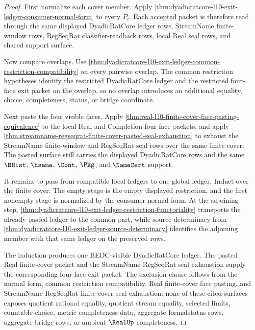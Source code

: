 \begin{proof}
First normalize each cover member. Apply \autoref{thm:dyadicratcore-l10-exit-ledger-consumer-normal-form} to every $P_i$. Each accepted packet is therefore read through the same displayed DyadicRatCore ledger rows, StreamName finite-window rows, RegSeqRat classifier-readback rows, local Real seal rows, and shared support surface.

Now compare overlaps. Use \autoref{thm:dyadicratcore-l10-exit-ledger-common-restriction-compatibility} on every pairwise overlap. The common restriction hypotheses identify the restricted DyadicRatCore ledger and the restricted four-face exit packet on the overlap, so no overlap introduces an additional equality, choice, completeness, status, or bridge coordinate.

Next paste the four visible faces. Apply \autoref{thm:real-l10-finite-cover-face-pasting-equivalence} to the local Real and Completion four-face packets, and apply \autoref{thm:streamname-regseqrat-finite-cover-pasted-seal-exhaustion} to exhaust the StreamName finite-window and RegSeqRat seal rows over the same finite cover. The pasted surface still carries the displayed DyadicRatCore rows and the same $\BHist$, $\hsame$, $\Cont$, $\Pkg$, and $\NameCert$ support.

It remains to pass from compatible local ledgers to one global ledger. Induct over the finite cover. The empty stage is the empty displayed restriction, and the first nonempty stage is normalized by the consumer normal form. At the adjoining step, \autoref{thm:dyadicratcore-l10-exit-ledger-restriction-functoriality} transports the already pasted ledger to the common part, while source determinacy from \autoref{thm:dyadicratcore-l10-exit-ledger-source-determinacy} identifies the adjoining member with that same ledger on the preserved rows.

The induction produces one BEDC-visible DyadicRatCore ledger. The pasted Real finite-cover packet and the StreamName-RegSeqRat seal exhaustion supply the corresponding four-face exit packet. The exclusion clause follows from the normal form, common restriction compatibility, Real finite-cover face pasting, and StreamName-RegSeqRat finite-cover seal exhaustion: none of these cited surfaces exposes quotient rational equality, quotient stream equality, selected limits, countable choice, metric-completeness data, aggregate formalstatus rows, aggregate bridge rows, or ambient $\RealUp$ completeness.
\end{proof}

